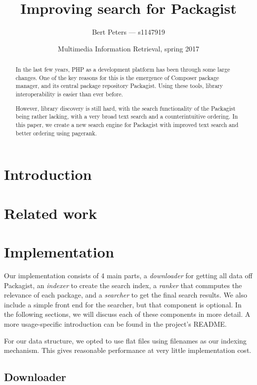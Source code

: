 \documentclass{article}
\title{Improving search for Packagist}
\author{Bert Peters --- s1147919}
\date{Multimedia Information Retrieval, spring 2017}
\begin{document}
\maketitle

\begin{abstract}
	In the last few years, PHP as a development platform has been through some large changes. One of the key reasons for this is the emergence of Composer package manager, and its central package repository Packagist. Using these tools, library interoperability is easier than ever before.

	However, library discovery is still hard, with the search functionality of the Packagist being rather lacking, with a very broad text search and a counterintuitive ordering. In this paper, we create a new search engine for Packagist with improved text search and better ordering using pagerank.
\end{abstract}

\section{Introduction}

\section{Related work}

\section{Implementation}

Our implementation consists of 4 main parts, a \emph{downloader} for getting all data off Packagist, an \emph{indexer} to create the search index, a \emph{ranker} that commputes the relevance of each package, and a \emph{searcher} to get the final search results. We also include a simple front end for the searcher, but that component is optional. In the following sections, we will discuss each of these components in more detail. A more usage-specific introduction can be found in the project's README.

For our data structure, we opted to use flat files using filenames as our indexing mechanism. This gives reasonable performance at very little implementation cost.

\subsection{Downloader}
\end{document}
